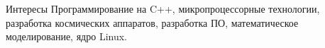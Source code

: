 \begin{rubric}{Интересы}
\nocite{*}
Программирование на C++, микропроцессорные технологии, разработка космических аппаратов, разработка ПО, математическое моделирование, ядро Linux.
\end{rubric}